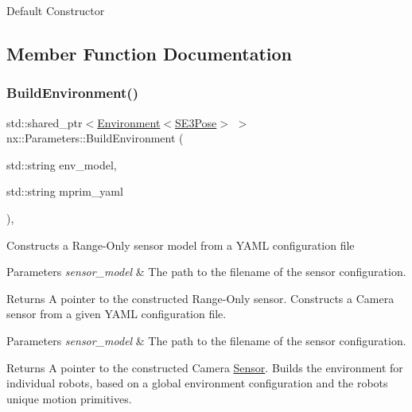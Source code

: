 Default Constructor 

\subsection{Member Function Documentation}
\mbox{\label{classnx_1_1Parameters_a0c4e7b6182700d0b197487fff137a7db}} 
\subsubsection{\texorpdfstring{Build\+Environment()}{BuildEnvironment()}}
{\footnotesize\ttfamily std\+::shared\+\_\+ptr$<$\hyperlink{classnx_1_1Environment}{Environment}$<$\hyperlink{structnx_1_1SE3Pose}{S\+E3\+Pose}$>$ $>$ nx\+::\+Parameters\+::\+Build\+Environment (\begin{DoxyParamCaption}\item[{std\+::string}]{env\+\_\+model,  }\item[{std\+::string}]{mprim\+\_\+yaml }\end{DoxyParamCaption})\hspace{0.3cm}{\ttfamily [inline]}, {\ttfamily [protected]}}

Constructs a Range-\/\+Only sensor model from a Y\+A\+ML configuration file 
\begin{DoxyParams}{Parameters}
{\em sensor\+\_\+model} & The path to the filename of the sensor configuration. \\
\hline
\end{DoxyParams}
\begin{DoxyReturn}{Returns}
A pointer to the constructed Range-\/\+Only sensor. Constructs a Camera sensor from a given Y\+A\+ML configuration file. 
\end{DoxyReturn}

\begin{DoxyParams}{Parameters}
{\em sensor\+\_\+model} & The path to the filename of the sensor configuration. \\
\hline
\end{DoxyParams}
\begin{DoxyReturn}{Returns}
A pointer to the constructed Camera \hyperlink{classnx_1_1Sensor}{Sensor}. Builds the environment for individual robots, based on a global environment configuration and the robot\textquotesingle{}s unique motion primitives. 
\end{DoxyReturn}

